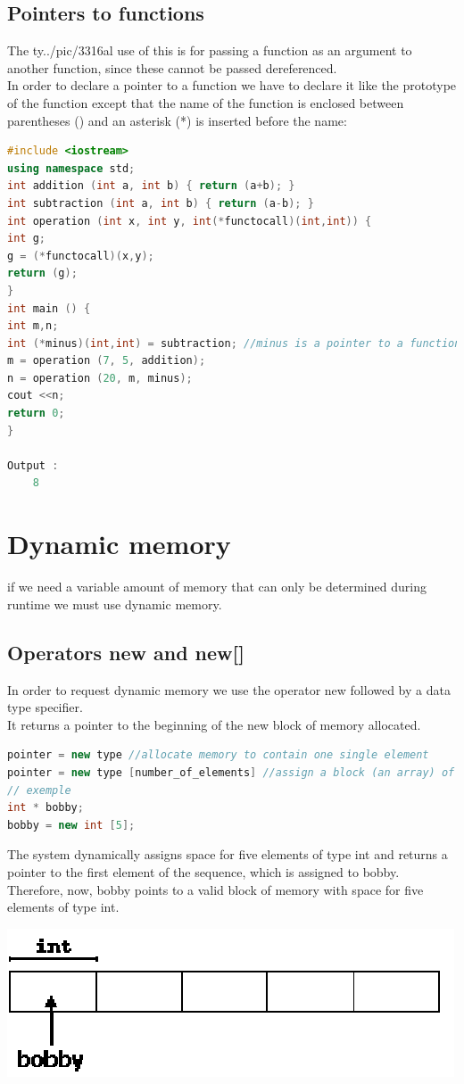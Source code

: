 \documentclass[12pt,oneside]{book}
\begin{document}
\subsection{Pointers to functions }
The ty../pic/3316al use of this is for passing a function as an argument to another function, since these cannot be passed dereferenced.\\
In order to declare a pointer to a function we have to
declare it like the prototype of the function except that the name of the function is enclosed between parentheses () and an asterisk (*) is inserted before the name:
\begin{lstlisting}[language=C++]
#include <iostream>
using namespace std; 
int addition (int a, int b) { return (a+b); } 
int subtraction (int a, int b) { return (a-b); } 
int operation (int x, int y, int(*functocall)(int,int)) { 
int g; 
g = (*functocall)(x,y); 
return (g); 
} 
int main () { 
int m,n; 
int (*minus)(int,int) = subtraction; //minus is a pointer to a function that has two parameters
m = operation (7, 5, addition); 
n = operation (20, m, minus); 
cout <<n; 
return 0; 
} 

Output :
    8
\end{lstlisting}
\section{Dynamic memory}
if we need a variable amount of memory that can only be determined during runtime we must use dynamic memory.
\subsection{Operators new and new[]}
In order to request dynamic memory we use the operator new followed by a data type specifier.\\
It returns a pointer to the beginning of the new block of memory allocated.
	\begin{lstlisting}[language=C++]
pointer = new type //allocate memory to contain one single element
pointer = new type [number_of_elements] //assign a block (an array) of elements of type type,
// exemple 
int * bobby; 
bobby = new int [5];
\end{lstlisting}
The system dynamically assigns space for five elements of type int and returns a pointer to the first element of the sequence, which is assigned to bobby.\\
Therefore, now, bobby points to a valid block of memory with space for five elements of type int.
\begin{center}
	\includegraphics[width=0.5\linewidth]{../pic/3316/36.png}
\end{center}
\end{document}
